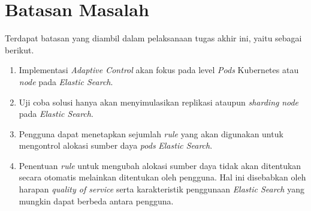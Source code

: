 \section{Batasan Masalah}

Terdapat batasan yang diambil dalam pelaksanaan tugas akhir ini, yaitu sebagai berikut.

\begin{enumerate}
    \item Implementasi \textit{Adaptive Control} akan fokus pada level \textit{Pods} Kubernetes atau \textit{node} pada \textit{Elastic Search}.
    \item Uji coba solusi hanya akan menyimulasikan replikasi ataupun \textit{sharding} \textit{node} pada \textit{Elastic Search}.
    \item Pengguna dapat menetapkan sejumlah \textit{rule} yang akan digunakan untuk mengontrol alokasi sumber daya \textit{pods} \textit{Elastic Search}.
    \item Penentuan \textit{rule} untuk mengubah alokasi sumber daya tidak akan ditentukan secara otomatis melainkan ditentukan oleh pengguna. Hal ini disebabkan oleh harapan \textit{quality of service} serta karakteristik penggunaan \textit{Elastic Search} yang mungkin dapat berbeda antara pengguna.
 \end{enumerate}

